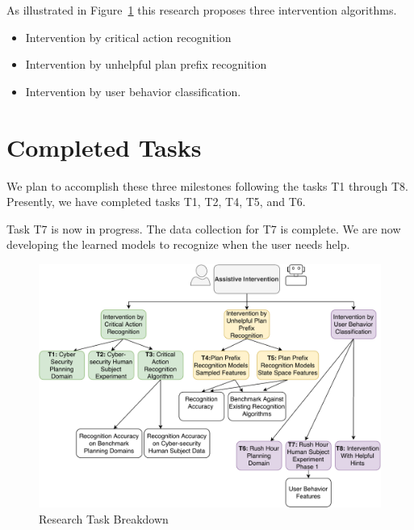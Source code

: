 \documentclass[doctor]{thesis} %
\theoremstyle{plain}
\begin{document}
As illustrated in Figure~\ref{fig:breakdown} this research proposes three intervention algorithms. 
\begin{itemize}
\item Intervention by critical action recognition
\item Intervention by unhelpful plan prefix recognition
\item Intervention by user behavior classification.
\end{itemize}

\section*{Completed Tasks}
We plan to accomplish these three milestones following the tasks T1 through T8. Presently, we have completed tasks T1, T2, T4, T5, and T6. 

Task T7 is now in progress. The data collection for T7 is complete. We are now developing the learned models to recognize when the user needs help.

\begin{figure}[!htb]
  \centering
  \includegraphics[width=\columnwidth, keepaspectratio=true]{img/tasks.pdf}
  \caption{Research Task Breakdown}
  \label{fig:breakdown}
\end{figure}



	
\end{document}
